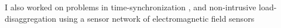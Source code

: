 \documentclass[10pt]{article}
\begin{document}




I also worked on problems in time-synchronization \cite{buevich2013hardware,
  dongare2017pulsar, rtas-alps-platform}, and non-intrusive load-disaggregation using a sensor network of electromagnetic field sensors \cite{rajagopal2013magnetic, rajagopal2013demo}

 



\end{document}

